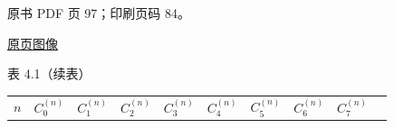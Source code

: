 原书 PDF 页 97；印刷页码 84。

\href{source-images/pdf-097.jpeg}{原页图像}

表 4.1（续表）

{\def\LTcaptype{none} %
\begin{longtable}[]{@{}
  >{\raggedright\arraybackslash}p{}
  >{\raggedright\arraybackslash}p{}
  >{\raggedright\arraybackslash}p{}
  >{\raggedright\arraybackslash}p{}
  >{\raggedright\arraybackslash}p{}
  >{\raggedright\arraybackslash}p{}
  >{\raggedright\arraybackslash}p{}
  >{\raggedright\arraybackslash}p{}
  >{\raggedright\arraybackslash}p{}
  >{\raggedright\arraybackslash}p{}@{}}
\toprule\noalign{}
\begin{minipage}[b]{\linewidth}\raggedright
\(n\)
\end{minipage} & \begin{minipage}[b]{\linewidth}\raggedright
\(C_0^{(n)}\)
\end{minipage} & \begin{minipage}[b]{\linewidth}\raggedright
\(C_1^{(n)}\)
\end{minipage} & \begin{minipage}[b]{\linewidth}\raggedright
\(C_2^{(n)}\)
\end{minipage} & \begin{minipage}[b]{\linewidth}\raggedright
\(C_3^{(n)}\)
\end{minipage} & \begin{minipage}[b]{\linewidth}\raggedright
\(C_4^{(n)}\)
\end{minipage} & \begin{minipage}[b]{\linewidth}\raggedright
\(C_5^{(n)}\)
\end{minipage} & \begin{minipage}[b]{\linewidth}\raggedright
\(C_6^{(n)}\)
\end{minipage} & \begin{minipage}[b]{\linewidth}\raggedright
\(C_7^{(n)}\)
\end{minipage} & \begin{minipage}[b]{\linewidth}\raggedright

\end{minipage}
\end{longtable}}
